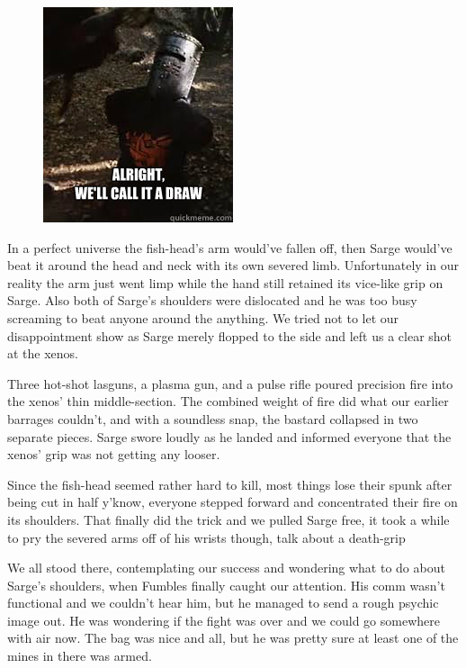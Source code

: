 \begin{figure}
	\begin{center}
		\includegraphics[width=\figwidth]{pics/11/54.png}
	\end{center}
\end{figure}
In a perfect universe the fish-head's arm would've fallen off, then Sarge would've beat it around the head and neck with its own severed limb. 
Unfortunately in our reality the arm just went limp while the hand still retained its vice-like grip on Sarge. 
Also both of Sarge's shoulders were dislocated and he was too busy screaming to beat anyone around the anything. 
We tried not to let our disappointment show as Sarge merely flopped to the side and left us a clear shot at the xenos.

Three hot-shot lasguns, a plasma gun, and a pulse rifle poured precision fire into the xenos' thin middle-section. 
The combined weight of fire did what our earlier barrages couldn't, and with a soundless snap, the bastard collapsed in two separate pieces. 
Sarge swore loudly as he landed and informed everyone that the xenos' grip was not getting any looser.

Since the fish-head seemed rather hard to kill, most things lose their spunk after being cut in half y'know, everyone stepped forward and concentrated their fire on its shoulders. 
That finally did the trick and we pulled Sarge free, it took a while to pry the severed arms off of his wrists though, talk about a death-grip

We all stood there, contemplating our success and wondering what to do about Sarge's shoulders, when Fumbles finally caught our attention. 
His comm wasn't functional and we couldn't hear him, but he managed to send a rough psychic image out. 
He was wondering if the fight was over and we could go somewhere with air now. 
The bag was nice and all, but he was pretty sure at least one of the mines in there was armed. 


